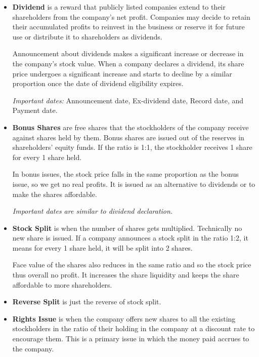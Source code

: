 \documentclass[12pt]{article}
\begin{document}
\begin{itemize}
    \item \textbf{Dividend} is a reward that publicly listed companies extend to their shareholders from the company's net profit. Companies may decide to retain their accumulated profits to reinvest in the business or reserve it for future use or distribute it to shareholders as dividends. 

    Announcement about dividends makes a significant increase or decrease in the company's stock value. When a company declares a dividend, its share price undergoes a significant increase and starts to decline by a similar proportion once the date of dividend eligibility expires. 

    \textit{Important dates:} Announcement date, Ex-dividend date, Record date, and Payment date.
    
    \item \textbf{Bonus Shares} are free shares that the stockholders of the company receive against shares held by them. Bonus shares are issued out of the reserves in shareholders' equity funds. If the ratio is 1:1, the stockholder receives 1 share for every 1 share held. 

    In bonus issues, the stock price falls in the same proportion as the bonus issue, so we get no real profits. It is issued as an alternative to dividends or to make the shares affordable. 
    
    \textit{Important dates are similar to dividend declaration.}
    
    \item \textbf{Stock Split} is when the number of shares gets multiplied. Technically no new share is issued. If a company announces a stock split in the ratio 1:2, it means for every 1 share held, it will be split into 2 shares.

    Face value of the shares also reduces in the same ratio and so the stock price thus overall no profit. It increases the share liquidity and keeps the share affordable to more shareholders.

    \item \textbf{Reverse Split} is just the reverse of stock split.

    \item \textbf{Rights Issue} is when the company offers new shares to all the existing stockholders in the ratio of their holding in the company at a discount rate to encourage them. This is a primary issue in which the money paid accrues to the company. 


\end{itemize}
\end{document}
